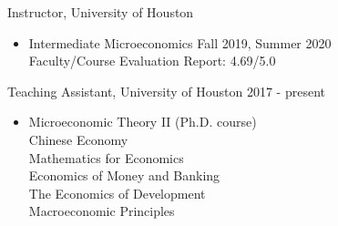 \documentclass[10pt]{article}
\renewcommand{\section}[1]{\pagebreak[3]%
    \hyphenpenalty=10000%
    \vspace{1.3\baselineskip}%
    \phantomsection\addcontentsline{toc}{section}{#1}%
    \noindent\llap{\scshape\smash{\parbox[t]{\marginparwidth}{\raggedright #1}}}%
    \vspace{-\baselineskip}\par}
\newenvironment{innerlist}[1][\enskip\textbullet]%
        {\begin{itemize}[#1,leftmargin=*,parsep=0pt,itemsep=0pt,topsep=0pt,partopsep=0pt]}
        {\end{itemize}}
\newcommand{\blankline}{\quad\pagebreak[3]}
\newcommand{\halfblankline}{\quad\vspace{-0.5\baselineskip}\pagebreak[3]}
\begin{document}
Instructor, University of Houston 
\begin{innerlist}
	\item[] Intermediate Microeconomics   \hfill {Fall 2019, Summer 2020}\\
	Faculty/Course Evaluation Report: 4.69/5.0\\
\end{innerlist}

Teaching Assistant, University of Houston \hfill {2017 - present}
\begin{innerlist}

\item[] Microeconomic Theory II (Ph.D. course)\\
		Chinese Economy\\
		 Mathematics for Economics \\
		Economics of Money and Banking \\
		The Economics of Development\\
		Macroeconomic Principles \\

\end{innerlist}


\halfblankline

\end{document}
